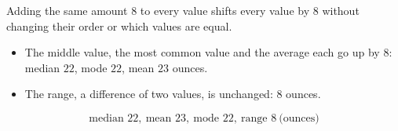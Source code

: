 Adding the same amount $8$ to every value shifts every value by $8$ without changing their order or which values are equal.
\begin{itemize}
\item The middle value, the most common value and the average each go up by $8$: median $22$, mode $22$, mean $23$ ounces.
\item The range, a difference of two values, is unchanged: $8$ ounces.
\end{itemize}
\[
\boxed{\text{median }22,\ \text{mean }23,\ \text{mode }22,\ \text{range }8\ \text{(ounces)}}
\]
